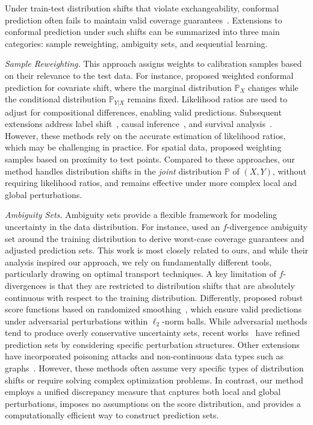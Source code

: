 \documentclass[11pt,a4paper]{article}
\begin{document}
Under train-test distribution shifts that violate exchangeability, conformal prediction often fails to maintain valid coverage guarantees~\cite{tibshirani2019conformal}. Extensions to conformal prediction under such shifts can be summarized into three main categories: sample reweighting, ambiguity sets, and sequential learning.

\medskip

\noindent\emph{Sample Reweighting.} This approach assigns weights to calibration samples based on their relevance to the test data. For instance, \cite{tibshirani2019conformal} proposed weighted conformal prediction for covariate shift, where the marginal distribution $\mathbb P_X$ changes while the conditional distribution $\mathbb P_{Y|X}$ remains fixed. Likelihood ratios are used to adjust for compositional differences, enabling valid predictions. Subsequent extensions address label shift~\cite{Podkopaev_2021}, causal inference~\cite{Lei_2021}, and survival analysis~\cite{Candes_2023, Gui_2022}. However, these methods rely on the accurate estimation of likelihood ratios, which may be challenging in practice. For spatial data, \cite{Mao_2022} proposed weighting samples based on proximity to test points. Compared to these approaches, our method handles distribution shifts in the \textit{joint} distribution $\mathbb P$ of $(X,Y)$, without requiring likelihood ratios, and remains effective under more complex local and global perturbations.

\medskip

\noindent\emph{Ambiguity Sets.} Ambiguity sets provide a flexible framework for modeling uncertainty in the data distribution. For instance, \cite{cauchois2024robust} used an $f$-divergence ambiguity set around the training distribution to derive worst-case coverage guarantees and adjusted prediction sets. This work is most closely related to ours, and while their analysis inspired our approach, we rely on fundamentally different tools, particularly drawing on optimal transport techniques. A key limitation of $f$-divergences is that they are restricted to distribution shifts that are absolutely continuous with respect to the training distribution. Differently, \cite{Gendler_2022} proposed robust score functions based on randomized smoothing~\cite{Cohen_2019, Kumar_2020}, which ensure valid predictions under adversarial perturbations within $\ell_2$-norm balls. While adversarial methods tend to produce overly conservative uncertainty sets, recent works~\cite{Yan_2024, Ghosh_2023, Clarkson_2024} have refined prediction sets by considering specific perturbation structures. Other extensions have incorporated poisoning attacks and non-continuous data types such as graphs~\cite{Zargarbashi_2024}. However, these methods often assume very specific types of distribution shifts or require solving complex optimization problems. In contrast, our method employs a unified discrepancy measure that captures both local and global perturbations, imposes no assumptions on the score distribution, and provides a computationally efficient way to construct prediction sets.
\end{document}
